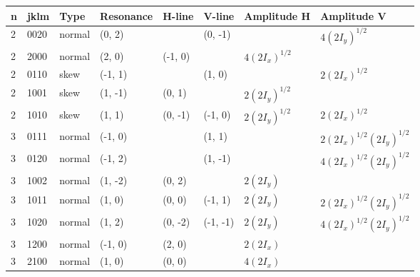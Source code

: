 {%
{\scriptsize
\begin{longtable}{llllllll}
\toprule()
n & jklm &   Type & Resonance &   H-line &   V-line &                                       Amplitude H &                                       Amplitude V \\
\midrule()
\endhead
2 & 0020 & normal &    (0, 2) &          &  (0, -1) &                                                   &              \colorbox{red!10}{$4  (2I_y)^ {1/2}$} \\
2 & 2000 & normal &    (2, 0) &  (-1, 0) &          &           \colorbox{orange!10}{$4 (2I_x)^ {1/2} $} &                                                   \\
2 & 0110 &   skew &   (-1, 1) &          &   (1, 0) &                                                   &           \colorbox{orange!10}{$2 (2I_x)^ {1/2} $} \\
2 & 1001 &   skew &   (1, -1) &   (0, 1) &          &              \colorbox{red!10}{$2  (2I_y)^ {1/2}$} &                                                   \\
2 & 1010 &   skew &    (1, 1) &  (0, -1) &  (-1, 0) &              \colorbox{red!10}{$2  (2I_y)^ {1/2}$} &           \colorbox{orange!10}{$2 (2I_x)^ {1/2} $} \\
\midrule()
3 & 0111 & normal &   (-1, 0) &          &   (1, 1) &                                                   & \colorbox{blue!10}{$2 (2I_x)^ {1/2} (2I_y)^ {1/2}$} \\
3 & 0120 & normal &   (-1, 2) &          &  (1, -1) &                                                   & \colorbox{blue!10}{$4 (2I_x)^ {1/2} (2I_y)^ {1/2}$} \\
3 & 1002 & normal &   (1, -2) &   (0, 2) &          &                    \colorbox{red!10}{$2  (2I_y)$} &                                                   \\
3 & 1011 & normal &    (1, 0) &   (0, 0) &  (-1, 1) &                    \colorbox{red!10}{$2  (2I_y)$} & \colorbox{blue!10}{$2 (2I_x)^ {1/2} (2I_y)^ {1/2}$} \\
3 & 1020 & normal &    (1, 2) &  (0, -2) & (-1, -1) &                    \colorbox{red!10}{$2  (2I_y)$} & \colorbox{blue!10}{$4 (2I_x)^ {1/2} (2I_y)^ {1/2}$} \\
3 & 1200 & normal &   (-1, 0) &   (2, 0) &          &                 \colorbox{orange!10}{$2 (2I_x) $} &                                                   \\
3 & 2100 & normal &    (1, 0) &   (0, 0) &          &                 \colorbox{orange!10}{$4 (2I_x) $} &                                                   \\

\end{longtable}}}
